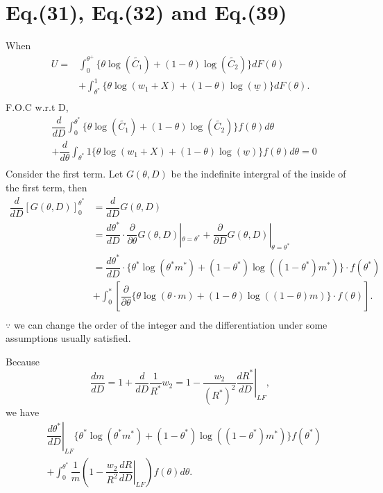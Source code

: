 \documentclass[a4paper,11pt]{article}
\begin{document}
\section{Eq.(31), Eq.(32) and Eq.(39)}	
	When
	\begin{align*}
			U = & \int_0^{\theta^+} \{ \theta \log (\tilde{C_1}) + (1-\theta) \log (\tilde{C_2}) \} dF(\theta) \\
			& + \int_{\theta^*}^{1} \{ \theta \log(w_1 + X) + (1-\theta) \log (\underline{w}) \}dF(\theta). \\
	\end{align*}
	F.O.C w.r.t D,
	\begin{align*}
			& \dfrac{d}{dD} \int_0^{\theta^*} \{ \theta \log (\tilde{C_1}) + (1-\theta)\log (\tilde{C_2}) \} f(\theta)d\theta \\ 
			& + \dfrac{d}{d\theta} \int_{\theta^*}{1}\{ \theta \log (w_1 + X) + (1-\theta)\log(\underline{w}) \}f(\theta)d\theta = 0 \\
	\end{align*}
	Consider the first term. Let $G(\theta,D)$ be the indefinite intergral of the inside of the first term, then
	\begin{align*}
		\dfrac{d}{dD}[ G (\theta, D)]_0^{\theta^*}  &= \dfrac{d}{dD} G(\theta,D) \\
			&= \dfrac{d\theta^*}{dD} \cdot \dfrac{\partial}{\partial \theta} G(\theta,D)|_{\theta = \theta^*} + \dfrac{\partial}{\partial D} G(\theta,D)|_{\theta = \theta^*} \\
			&= \dfrac{d\theta^*}{dD} \cdot \{ \theta^* \log (\theta^* m^*) + (1-\theta^*) \log ((1-\theta^*)m^*) \} \cdot f(\theta^*) \\
			& + \int_{0}^{*} \left[ \dfrac{\partial}{\partial \theta} \{ \theta \log(\theta \cdot m) + (1 -\theta) \log((1-\theta)m) \} \cdot f(\theta) \right]. \\
	\end{align*}
	$\because$ we can change the order of the integer and the differentiation under some assumptions usually satisfied.
	
	Because
	\begin{equation*}
		\dfrac{dm}{dD} = 1 + \dfrac{d}{dD} \dfrac{1}{R^*}w_2 = 1 - \dfrac{w_2}{{(R^*)}^2} \left. \dfrac{dR^*}{dD}\right|_{LF},
	\end{equation*}
	we have
	\begin{align*}
		& \left. \dfrac{d\theta^*}{dD}\right|_{LF} \{ \theta^* \log (\theta^* m^*) + (1-\theta^*) \log ((1-\theta^*)m^*)\} f(\theta^*) \\
		& + \int_0^{\theta^*} \dfrac{1}{m}\left( 1 - \dfrac{w_2}{R^2} \left. \dfrac{dR}{dD}\right|_{LF}\right) f(\theta)d\theta.
	\end{align*}
	
\end{document}
